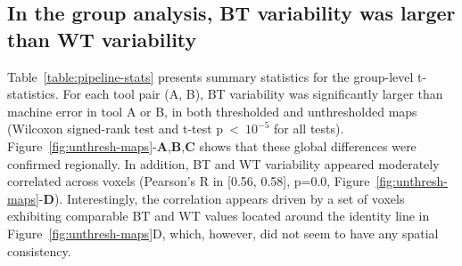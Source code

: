 \documentclass[11pt,onecolumn]{article}
\begin{document}
{\subsection{In the group analysis, BT variability was larger than WT variability}

Table~\ref{table:pipeline-stats} presents summary statistics for the
group-level t-statistics. For each tool pair (A, B), BT variability was
significantly larger than machine error in tool A or B, in both thresholded
and unthresholded maps (Wilcoxon signed-rank test and t-test p~\textless~$10^{-5}$ for all tests).
Figure~\ref{fig:unthresh-maps}-\textbf{A},\textbf{B},\textbf{C} shows that
these global differences were confirmed regionally.
In addition, BT and WT variability appeared moderately correlated across voxels (Pearson's R
in [0.56, 0.58], p=0.0, Figure~\ref{fig:unthresh-maps}-\textbf{D}). Interestingly, the correlation
appears driven by a set of voxels exhibiting comparable BT and
WT values located around the identity line in Figure~\ref{fig:unthresh-maps}D, which, however, did not seem to have
any spatial consistency.


}
\end{document}
